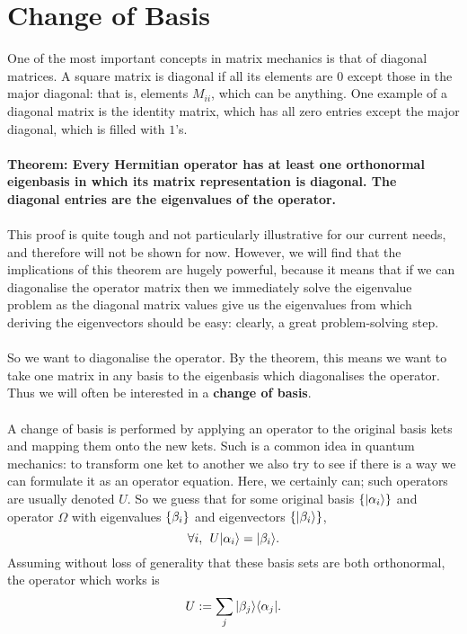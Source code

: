 \section{Change of Basis}
One of the most important concepts in matrix mechanics is that of diagonal matrices. A square matrix is diagonal if all its elements are $0$ except those in the major diagonal: that is, elements $M_{ii}$, which can be anything. One example of a diagonal matrix is the identity matrix, which has all zero entries except the major diagonal, which is filled with $1$'s.
\\\\
\textbf{{Theorem: Every Hermitian operator has at least one orthonormal}} \\
\textbf{{eigenbasis in which its matrix representation is diagonal. The}}\\ 
\textbf{{diagonal entries are the eigenvalues of the operator.}}
\\\\
This proof is quite tough and not particularly illustrative for our current needs, and therefore will not be shown for now. However, we will find that the implications of this theorem are hugely powerful, because it means that if we can diagonalise the operator matrix then we immediately solve the eigenvalue problem as the diagonal matrix values give us the eigenvalues from which deriving the eigenvectors should be easy: clearly, a great problem-solving step.
\\\\
So we want to diagonalise the operator. By the theorem, this means we want to take one matrix in any basis to the eigenbasis which diagonalises the operator. Thus we will often be  interested in a \textbf{change of basis}.
\\\\
A change of basis is performed by applying an operator to the original basis kets and mapping them onto the new kets. Such is a common idea in quantum mechanics: to transform one ket to another we also try to see if there is a way we can formulate it as an operator equation. Here, we certainly can; such operators are usually denoted $U$. So we guess that for some original basis $\{|\alpha_{i}\rangle\}$ and operator $\Omega$ with eigenvalues $\{\beta_{i}\}$ and eigenvectors $\{|\beta_{i}\rangle\}$,
$$
\forall i, \:\: U|\alpha_{i}\rangle=|\beta_{i}\rangle.
$$
Assuming without loss of generality that these basis sets are both orthonormal, the operator which works is
$$
U:=\sum_{j}|\beta_{j}\rangle\langle\alpha_{j}|.
$$
